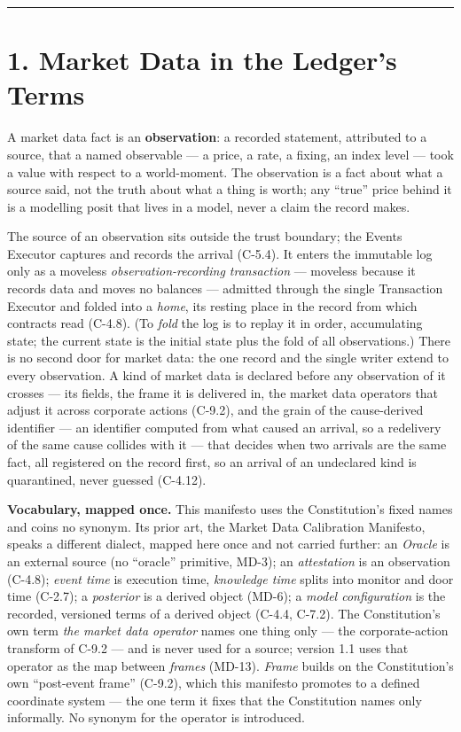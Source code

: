 \documentclass[11pt,a4paper]{article}
\begin{document}
\vspace{0.4em}
\begin{center}\rule{0.35\linewidth}{0.4pt}\end{center}
\vspace{0.6em}

\section{1. Market Data in the Ledger's Terms}

A market data fact is an \textbf{observation}: a recorded statement,
attributed to a source, that a named observable --- a price, a rate, a
fixing, an index level --- took a value with respect to a world-moment.
The observation is a fact about what a source said, not the truth about
what a thing is worth; any ``true'' price behind it is a modelling posit
that lives in a model, never a claim the record makes.

The source of an observation sits outside the trust boundary; the Events
Executor captures and records the arrival (C-5.4). It enters the immutable
log only as a moveless \emph{observation-recording transaction} ---
moveless because it records data and moves no balances --- admitted
through the single Transaction Executor and folded into a \emph{home}, its
resting place in the record from which contracts read (C-4.8). (To
\emph{fold} the log is to replay it in order, accumulating state; the
current state is the initial state plus the fold of all observations.)
There is no second door for market data: the one record and the single
writer extend to every observation. A kind of
market data is declared before any observation of it crosses --- its
fields, the frame it is delivered in, the market data operators that
adjust it across corporate actions (C-9.2), and the grain of the
cause-derived identifier --- an identifier computed
from what caused an arrival, so a redelivery of the same cause collides
with it --- that decides when two arrivals are the same fact, all
registered on the record first, so an arrival of an undeclared kind is
quarantined, never guessed (C-4.12).

\textbf{Vocabulary, mapped once.} This manifesto uses the Constitution's
fixed names and coins no synonym. Its prior art, the Market Data
Calibration Manifesto, speaks a different dialect, mapped here once and
not carried further: an \emph{Oracle} is an external source (no
``oracle'' primitive, MD-3); an \emph{attestation} is an observation
(C-4.8); \emph{event time} is execution time, \emph{knowledge time}
splits into monitor and door time (C-2.7); a \emph{posterior} is a derived
object (MD-6); a \emph{model configuration} is the recorded, versioned
terms of a derived object (C-4.4, C-7.2). The Constitution's own
term \emph{the market data operator} names one thing only --- the
corporate-action transform of C-9.2 --- and is never used for a source;
version 1.1 uses that operator as the map between \emph{frames} (MD-13).
\emph{Frame} builds on the Constitution's own ``post-event frame''
(C-9.2), which this manifesto promotes to a defined coordinate system ---
the one term it fixes that the Constitution names only informally. No
synonym for the
operator is introduced.
\end{document}
